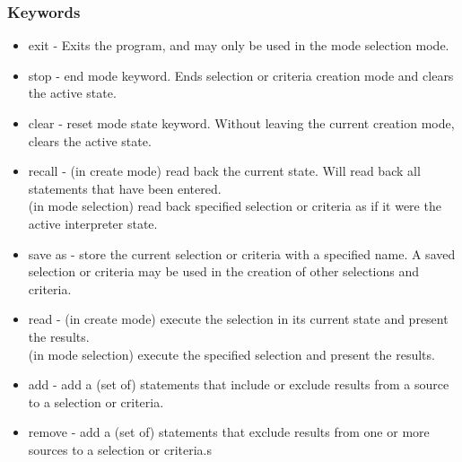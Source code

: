 \subsubsection{Keywords}
\begin{itemize}
\item exit - Exits the program, and may only be used in the mode selection mode.
\item stop - end mode keyword. Ends selection or criteria creation mode and clears the active state.
\item clear - reset mode state keyword. Without leaving the current creation mode, clears the active state.
\item recall - (in create mode) read back the current state. Will read back all statements that have been entered.\\(in mode selection) read back specified selection or criteria as if it were the active interpreter state.
\item save as - store the current selection or criteria with a specified name. A saved selection or criteria may be used in the creation of other selections and criteria.
\item read - (in create mode) execute the selection in its current state and present the results.\\(in mode selection) execute the specified selection and present the results.
\item add - add a (set of) statements that include or exclude results from a source to a selection or criteria.
\item remove - add a (set of) statements that exclude results from one or more sources to a selection or criteria.s
\end{itemize}